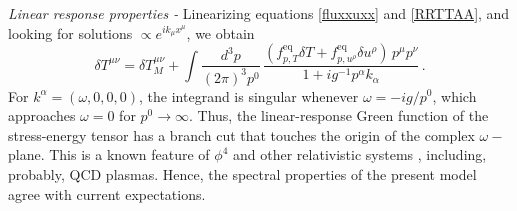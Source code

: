 \documentclass[a4paper, amsfonts, amssymb, amsmath, reprint, showkeys, twoside,notitlepage]{revtex4-2}
\begin{document}
\textit{Linear response properties -} 
Linearizing equations \eqref{fluxxuxx} and \eqref{RRTTAA}, and looking for solutions $\propto e^{ik_\mu x^\mu}$, we obtain 
\begin{equation}
\delta T^{\mu \nu}{=}\delta T^{\mu \nu}_M{+} \! \! \int \dfrac{d^3 p }{(2\pi)^3p^0} \, \dfrac{(f_{p,T}^{\text{eq}}\delta T{+}f_{p,u^\rho}^{\text{eq}}\delta u^\rho) \, p^\mu p^\nu}{1+ig^{-1}p^\alpha k_\alpha} \, .
\end{equation}
For $k^\alpha=(\omega,0,0,0)$, the integrand is singular whenever $\omega{=} - ig/p^0$, which approaches $\omega=0$ for $p^0 {\rightarrow} \infty$. Thus, the linear-response Green function of the stress-energy tensor has a branch cut that touches the origin of the complex $\omega-$plane. This is a known feature of $\phi^4$ \cite{MooreCuts2018mma,Rocha:2024cge} and other relativistic systems \cite{GavassinoGapless2024rck}, including, probably, QCD plasmas. Hence, the spectral properties of the present model agree with current expectations.
\end{document}
